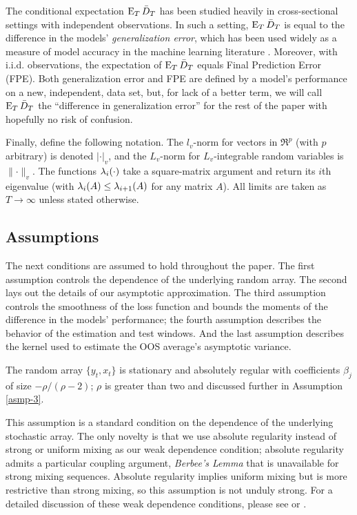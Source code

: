 \documentclass[12pt]{article}
\begin{document}
The conditional expectation $\operatorname{E}_T \bar{D}_{T}$ has been studied heavily in
cross-sectional settings with independent observations. In such a
setting, $\operatorname{E}_T \bar{D}_{T}$ is equal to the difference in the models'
\emph{generalization error}, which has been used widely as a measure
of model accuracy in the machine
learning literature \citep[see][for further discussion]{HTF:08}.
Moreover, with i.i.d. observations, the expectation of $\operatorname{E}_T \bar{D}_{T}$
equals  Final Prediction Error (FPE). Both
generalization error and FPE are defined by a model's
performance on a new, independent, data set, but, for lack of a better
term, we will call $\operatorname{E}_T \bar{D}_{T}$ the ``difference in generalization error''
for the rest of the paper with hopefully no risk of confusion.

Finally, define the following notation.  The $l_v$-norm for vectors in
$\Re^p$ (with $p$ arbitrary) is denoted $\lvert \cdot \rvert_v$, and
the $L_v$-norm for $L_v$-integrable random variables is $\lVert \cdot
\rVert_v$.  The functions $\operatorname{\lambda}_i(\cdot)$ take a square-matrix
argument and return its $i$th eigenvalue (with $\operatorname{\lambda}_{i}(A) \leq
\operatorname{\lambda}_{i+1}(A)$ for any matrix $A$).  All limits are taken as $T \to
\infty$ unless stated otherwise.

\subsection{Assumptions}
\label{sec:asmp}

The next conditions are assumed to hold throughout the paper.  The first
assumption controls the dependence of the underlying random array.
The second lays out the details of our asymptotic approximation.
The third assumption controls the
smoothness of the loss function and bounds the moments of the
difference in the models' performance; the fourth assumption describes
the behavior of the estimation and test windows.  And the last
assumption describes the kernel used to estimate the OOS average's
asymptotic variance.

\begin{asmp}\label{asmp-1}
  The random array $\{y_t,x_t\}$ is stationary and absolutely regular
  with coefficients $\beta_j$ of size $-\rho/(\rho-2)$; $\rho$ is
  greater than two and discussed further in Assumption \ref{asmp-3}.
\end{asmp}

This assumption is a standard condition on the dependence of the
underlying stochastic array. The only novelty is that we use
absolute regularity instead of strong or uniform mixing as our
weak dependence condition; absolute regularity admits a particular
coupling argument, \emph{Berbee's Lemma} \citep[reproduced in this
paper as Lemma A.1 for reference]{Ber:79} that is
unavailable for strong mixing sequences. Absolute regularity
implies uniform mixing but is more restrictive than strong mixing,
so this assumption is not unduly strong.
For a detailed discussion of these weak dependence conditions,
please see \citet{Dav:94} or \citet{Dou:94}.
\end{document}
